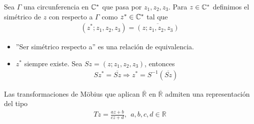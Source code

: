 \begin{defi}
    Sea $\Gamma$ una circunferencia en $\mathbb{C}^*$ que pasa por $z_1,z_2,z_3$. Para $z \in \mathbb{C}^*$ definimos el simétrico de $z$ con respecto a $\Gamma$ como $z^* \in \mathbb{C}^*$ tal que
    \begin{align*}
        (z^*;z_1,z_2,z_3) = \overline{(z;z_1,z_2,z_3)}
    \end{align*}
\end{defi}

\begin{obs}
    \begin{itemize}
        \item ''Ser simétrico respecto a'' es una relación de equivalencia.
        \item $z^*$ siempre existe. Sea $Sz = (z;z_1,z_2,z_3)$, entonces
              \begin{align*}
                  Sz^* = \overline{Sz} \Longrightarrow z^* = S^{-1}(\overline{Sz})
              \end{align*}
    \end{itemize}
\end{obs}

\begin{lema}
    Las transformaciones de M\"obius que aplican $\overline{\mathbb{R}}$ en $\overline{\mathbb{R}}$ admiten una representación del tipo
    \begin{align*}
        Tz = \frac{az + b}{cz + d}, \ \ a,b,c,d \in \mathbb{R}
    \end{align*}
\end{lema}

